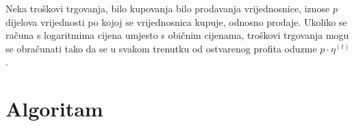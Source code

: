 \documentclass[lmodern, utf8, diplomski, numeric]{fer}
\begin{document}
  Neka troškovi trgovanja, bilo kupovanja bilo prodavanja vrijednosnice, iznose $p$ dijelova vrijednosti po kojoj se vrijednosnica kupuje, odnosno prodaje.
  Ukoliko se računa s logaritmima cijena umjesto s običnim cijenama, troškovi trgovanja mogu se obračunati tako da se u svakom trenutku od ostvarenog profita oduzme $p \cdot \eta^{(t)}$.
  
%  
  
\chapter{Algoritam}
\end{document}

